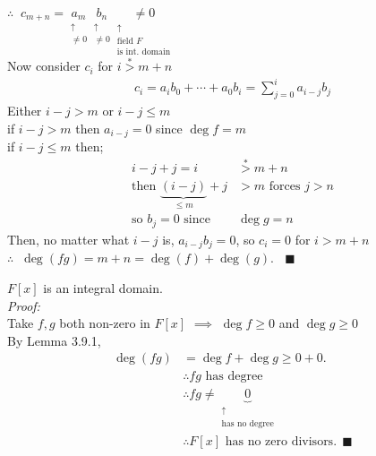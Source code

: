 \begin{lemma}
    $\therefore \ $
    $c_{m+n}=\underset{\substack{\uparrow \\ \neq 0}}{a_m}\underset{\substack{\uparrow \\ \neq 0}}{b_n} \underset{\substack{\uparrow \ \ \\ \text{field }F \\ \text{is int. domain}}}{\neq 0} $
    \\
    Now consider $c_i$ for $i\overset{*}{>}m+n$
    \begin{align}
        c_i = a_ib_0 + \cdots + a_0b_i = \sum_{j=0}^i a_{i-j}b_j \nonumber
    \end{align}
    Either $i-j>m$ or $i-j \leq m$ \\
    \noindent if $i-j>m$ then $a_{i-j}=0$ since $\deg f = m$ \\
    \noindent if $i-j \leq m$ then;
    \begin{align}
        i-j + j = i &\overset{*}{>} m + n \nonumber \\
        \text{then } \underbrace{(i-j)}_{\leq m} +j &> m  \text{ forces }j>n \nonumber \\
        \text{so }b_j = 0 \text{ since } &\deg g = n  \nonumber
    \end{align}
    Then, no matter what $i-j$ is, $a_{i-j}b_j=0$, so $c_i=0$ for $i>m+n$ \\ \steezybreak
    $\therefore \ $ $\deg (fg) = m + n = \deg(f)+\deg(g). \ \ \ \ \blacksquare$
\end{lemma}
\setcounter{dummy_lemma}{0}
\begin{corollary}
    $F[x]$ is an integral domain. \\ \steezybreak
    \textit{Proof:} \\ \steezybreak
    Take $f,g$ both non-zero in $F[x]$ $ \implies $ $\deg f\geq 0$ and $\deg g \geq 0$ \\
    By Lemma 3.9.1,
    \begin{align}
        \deg(fg)&=\deg f +\deg g \geq 0 + 0. \nonumber \\
        &\therefore fg \text{ has degree} \nonumber \\
        & \therefore fg \neq \underbrace{0}_{\substack{\uparrow \\ \text{has no degree}}} \nonumber \\
        & \therefore F[x] \text{ has no zero divisors.} \ \ \blacksquare \nonumber
    \end{align}
\end{corollary}

